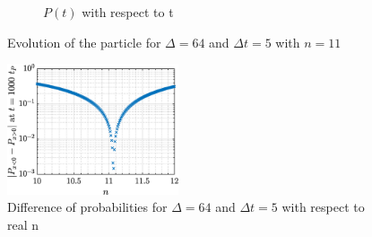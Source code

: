 \documentclass[a4paper,12pt,twoside]{article}
\begin{document}
\begin{figure}[h]
\begin{subfigure}[t]{0.45\textwidth}
    \caption{$P(t)$ with respect to t}
    \label{fig:iii_findn_psi}
  \end{subfigure}
  \caption{Evolution of the particle for $\Delta = 64$ and $\Delta t = 5$ with $n=11$}
  \label{fig:iii_findn}
\end{figure}





\begin{figure}[h]
  \centering
  \includegraphics[width=0.45\textwidth]{graphs/iii_findn_cont_n.eps}
  \caption{Difference of probabilities for $\Delta = 64$ and $\Delta t = 5$ with respect to real n}
  \label{fig:iii_findn_n}
\end{figure}
\end{document}
